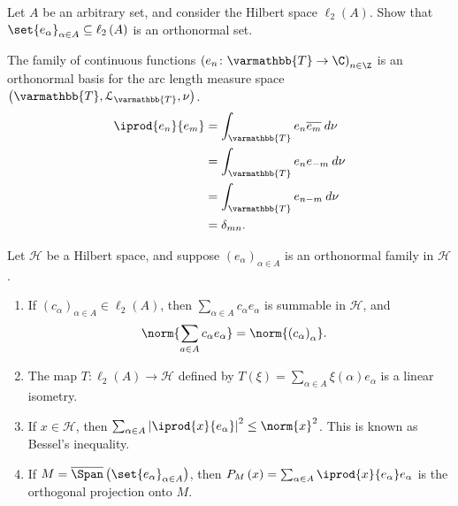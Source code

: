 \documentclass[10pt]{mypackage}
\renewcommand*{\mathbb}[1]{\varmathbb{#1}}
\begin{document}
\begin{exercise}
  Let $A$ be an arbitrary set, and consider the Hilbert space $\ell_{2}\left(A\right)$. Show that $\set{e_{\alpha}}_{\alpha \in A}\subseteq \ell_{2}\left(A\right)$ is an orthonormal set.
\end{exercise}
\begin{example}
  The family of continuous functions $\left(e_n\colon \mathbb{T}\rightarrow \C\right)_{n\in \Z}$ is an orthonormal basis for the arc length measure space $\left(\mathbb{T},\mathcal{L}_{\mathbb{T}},\nu\right)$.
  \begin{align*}
    \iprod{e_n}{e_m} &= \int_{\mathbb{T}}^{} e_{n}\overline{e_{m}}\:d\nu\\
                     &= \int_{\mathbb{T}}^{} e_{n}e_{-m}\:d\nu\\
                     &= \int_{\mathbb{T}}^{} e_{n-m}\:d\nu\\
                     &= \delta_{mn}.
  \end{align*}
\end{example}
\begin{theorem}
  Let $\mathcal{H}$ be a Hilbert space, and suppose $\left(e_{\alpha}\right)_{\alpha \in A}$ is an orthonormal family in $\mathcal{H}$.
  \begin{enumerate}[(1)]
    \item If $\left(c_{\alpha}\right)_{\alpha\in A}\in \ell_{2}\left(A\right)$, then $\sum_{\alpha \in A}c_{\alpha}e_{\alpha}$ is summable in $\mathcal{H}$, and
      \begin{align*}
        \norm{\sum_{a\in A}c_{\alpha}e_{\alpha}} &= \norm{\left(c_{\alpha}\right)_{\alpha}}.
      \end{align*}
    \item The map $T: \ell_{2}\left(A\right)\rightarrow \mathcal{H}$ defined by $T\left(\xi\right) = \sum_{\alpha \in A}\xi\left(\alpha\right)e_{\alpha}$ is a linear isometry.
    \item If $x\in \mathcal{H}$, then $\sum_{\alpha \in A}\left\vert \iprod{x}{e_{\alpha}} \right\vert^{2}\leq \norm{x}^2$. This is known as Bessel's inequality.
    \item If $M = \overline{\Span}\left(\set{e_{\alpha}}_{\alpha \in A}\right)$, then $P_{M}\left(x\right) = \sum_{\alpha \in A} \iprod{x}{e_{\alpha}}e_{\alpha}$ is the orthogonal projection onto $M$.
  \end{enumerate}
\end{theorem}
\end{document}
